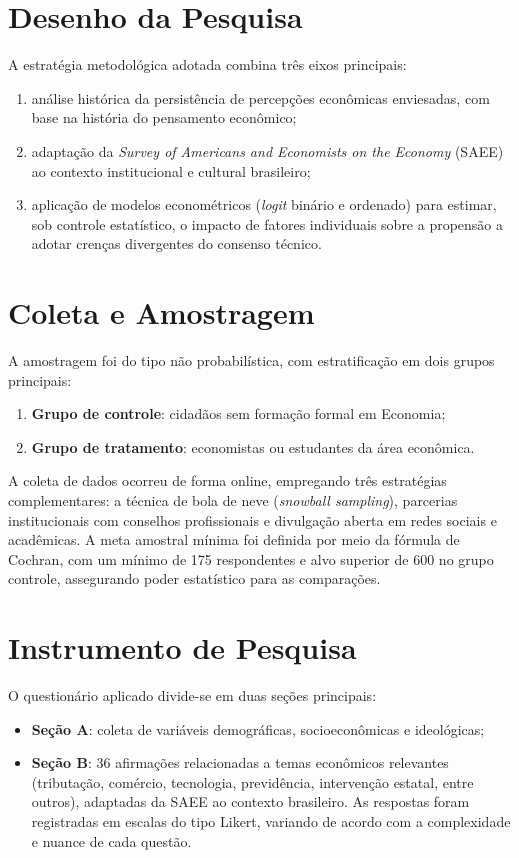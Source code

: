 \section{Desenho da Pesquisa}

A estratégia metodológica adotada combina três eixos principais:
\begin{enumerate}[label=\alph*)]
    \item análise histórica da persistência de percepções econômicas enviesadas, com base na história do pensamento econômico;
    \item adaptação da \textit{Survey of Americans and Economists on the Economy} (SAEE) ao contexto institucional e cultural brasileiro;
    \item aplicação de modelos econométricos (\textit{logit} binário e ordenado) para estimar, sob controle estatístico, o impacto de fatores individuais sobre a propensão a adotar crenças divergentes do consenso técnico.
\end{enumerate}

\section{Coleta e Amostragem}

A amostragem foi do tipo não probabilística, com estratificação em dois grupos principais:
\begin{enumerate}[label=\alph*)]
    \item \textbf{Grupo de controle}: cidadãos sem formação formal em Economia;
    \item \textbf{Grupo de tratamento}: economistas ou estudantes da área econômica.
\end{enumerate}

A coleta de dados ocorreu de forma online, empregando três estratégias complementares: a técnica de bola de neve (\textit{snowball sampling}), parcerias institucionais com conselhos profissionais e divulgação aberta em redes sociais e acadêmicas. A meta amostral mínima foi definida por meio da fórmula de Cochran, com um mínimo de 175 respondentes e alvo superior de 600 no grupo controle, assegurando poder estatístico para as comparações.

\section{Instrumento de Pesquisa}

O questionário aplicado divide-se em duas seções principais:
\begin{itemize}
    \item \textbf{Seção A}: coleta de variáveis demográficas, socioeconômicas e ideológicas;
    \item \textbf{Seção B}: 36 afirmações relacionadas a temas econômicos relevantes (tributação, comércio, tecnologia, previdência, intervenção estatal, entre outros), adaptadas da SAEE ao contexto brasileiro. As respostas foram registradas em escalas do tipo Likert, variando de acordo com a complexidade e nuance de cada questão.
\end{itemize}

